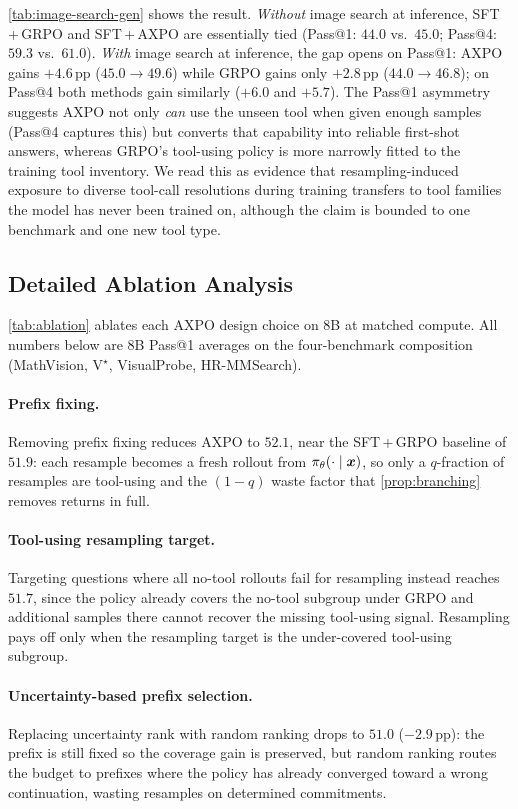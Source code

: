 \autoref{tab:image-search-gen} shows the result. \emph{Without} image search at inference, SFT\,+\,GRPO and SFT\,+\,AXPO are essentially tied (Pass@1: $44.0$ vs.\ $45.0$; Pass@4: $59.3$ vs.\ $61.0$). \emph{With} image search at inference, the gap opens on Pass@1: AXPO gains $+4.6$\,pp ($45.0 \to 49.6$) while GRPO gains only $+2.8$\,pp ($44.0 \to 46.8$); on Pass@4 both methods gain similarly ($+6.0$ and $+5.7$). The Pass@1 asymmetry suggests AXPO not only \emph{can} use the unseen tool when given enough samples (Pass@4 captures this) but converts that capability into reliable first-shot answers, whereas GRPO's tool-using policy is more narrowly fitted to the training tool inventory. We read this as evidence that resampling-induced exposure to diverse tool-call resolutions during training transfers to tool families the model has never been trained on, although the claim is bounded to one benchmark and one new tool type.

\subsection{Detailed Ablation Analysis}
\label{app:ablation-details}

\autoref{tab:ablation} ablates each AXPO design choice on 8B at matched compute. All numbers below are 8B Pass@1 averages on the four-benchmark composition (MathVision, V$^{\star}$, VisualProbe, HR-MMSearch).

\paragraph{Prefix fixing.}
Removing prefix fixing reduces AXPO to $52.1$, near the SFT\,+\,GRPO baseline of $51.9$: each resample becomes a fresh rollout from $\pi_\theta(\cdot \mid {\bm{x}})$, so only a $q$-fraction of resamples are tool-using and the $(1{-}q)$ waste factor that \autoref{prop:branching} removes returns in full.

\paragraph{Tool-using resampling target.}
Targeting questions where all no-tool rollouts fail for resampling instead reaches $51.7$, since the policy already covers the no-tool subgroup under GRPO and additional samples there cannot recover the missing tool-using signal. Resampling pays off only when the resampling target is the under-covered tool-using subgroup.

\paragraph{Uncertainty-based prefix selection.}
Replacing uncertainty rank with random ranking drops to $51.0$ ($-2.9$\,pp): the prefix is still fixed so the coverage gain is preserved, but random ranking routes the budget to prefixes where the policy has already converged toward a wrong continuation, wasting resamples on determined commitments.

